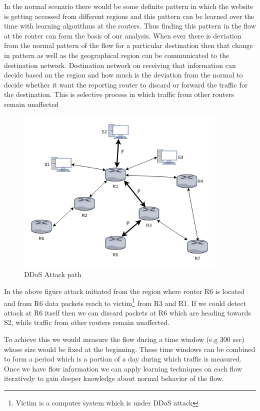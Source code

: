 \documentclass[10pt,oneside,a4paper]{article}
\begin{document}
In the normal scenario there would be some definite pattern in which the website is getting accessed from different regions and this pattern can be learned over the time with learning algorithms at the routers. Thus finding this pattern in the flow at the router can form the basis of our analysis. When ever there is deviation from the normal pattern of the flow for a particular destination then that change in pattern as well as the geographical region can be communicated to the destination network. Destination network on receiving that information can decide based on the region and how much is the deviation from the normal to decide whether it want the reporting router to discard or forward the traffic for the destination. This is selective process in which traffic from other routers remain unaffected\par

\begin{figure}[H]
\centering
\includegraphics[width=0.90\textwidth]{RouterCommunication}
\caption{DDoS Attack path} \label{fig:attackpath}
\end{figure}


In the above figure attack initiated from the region where router R6 is located and from R6 data packets reach to victim\footnote{Victim is a computer system which is under DDoS attack} from R3 and R1. If we could detect attack at R6 itself then we can discard packets at R6 which are heading towards S2, while traffic from other routers remain unaffected.

To achieve this we would measure the flow during a time window (e.g 300 sec) whose size would be fixed at the beginning.
These time windows can be combined to form a period which is a portion of a day during which traffic is measured. Once we have flow information we can apply learning techniques on each flow iteratively to gain deeper knowledge about normal behavior of the flow.\par
\end{document}
